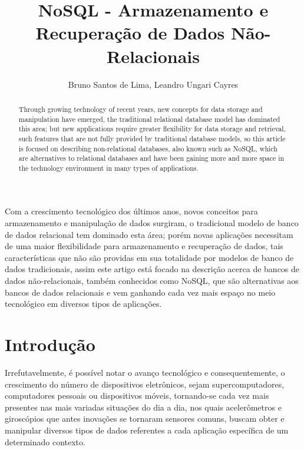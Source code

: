 \documentclass[12pt]{article}
\title{NoSQL - Armazenamento e Recuperação de Dados Não-Relacionais}
\author{Bruno Santos de Lima\inst{1}, Leandro Ungari Cayres\inst{1} }
\begin{document}
 

\maketitle

\begin{abstract}

Through growing technology of recent years, new concepts for data storage and manipulation have emerged, the traditional relational database model has dominated this area; but new applications require greater flexibility for data storage and retrieval, such features that are not fully provided by traditional database models, so this article is focused on describing non-relational databases, also known such as NoSQL, which are alternatives to relational databases and have been gaining more and more space in the technology environment in many types of applications.

\end{abstract}
     
\begin{resumo} 

Com a crescimento tecnológico dos últimos anos, novos conceitos para armazenamento e manipulação de dados surgiram, o tradicional modelo de banco de dados relacional tem dominado esta área; porém novas aplicações necessitam de uma maior flexibilidade para armazenamento e recuperação de dados, tais características que não são providas em sua totalidade por modelos de banco de dados tradicionais, assim este artigo está focado na descrição acerca de bancos de dados não-relacionais, também conhecidos como NoSQL, que são alternativas aos bancos de dados relacionais e vem ganhando cada vez mais espaço no meio tecnológico em diversos tipos de aplicações.

\end{resumo}

\section{Introdução}
\label{sec:intro}

Irrefutavelmente, é possível notar o avanço tecnológico e consequentemente, o crescimento do número de dispositivos eletrônicos, sejam supercomputadores, computadores pessoais ou dispositivos móveis, tornando-se cada vez mais presentes nas mais variadas situações do dia a dia, nos quais acelerômetros e giroscópios que antes inovações se tornaram sensores comuns, buscam obter e manipular diversos tipos de dados referentes a cada aplicação específica de um determinado contexto.
\end{document}

